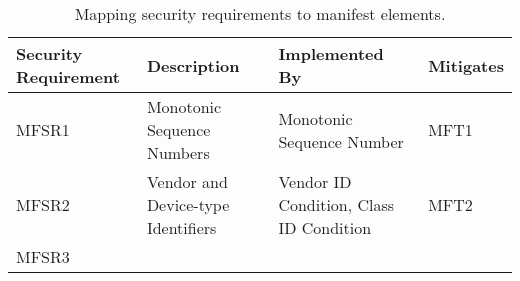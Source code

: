 \documentclass[0-thesis.tex]{subfiles}
\begin{document}
\begin{longtable}[]{@{}llll@{}}
    \caption{Mapping security requirements to manifest elements.}
    \label{tab:requirements-to-elements}\\
    \toprule
    \begin{minipage}[b]{0.16\columnwidth}\raggedright\strut Security Requirement\strut
    \end{minipage} & \begin{minipage}[b]{0.29\columnwidth}\raggedright\strut
    Description\strut \end{minipage} &
    \begin{minipage}[b]{0.34\columnwidth}\raggedright\strut Implemented By\strut
    \end{minipage} & \begin{minipage}[b]{0.10\columnwidth}\raggedright\strut
    Mitigates\strut \end{minipage}\tabularnewline
    \midrule
    \endhead
    \begin{minipage}[t]{0.16\columnwidth}\raggedright\strut MFSR1\strut \end{minipage} &
    \begin{minipage}[t]{0.29\columnwidth}\raggedright\strut Monotonic Sequence
    Numbers\strut \end{minipage} & \begin{minipage}[t]{0.34\columnwidth}\raggedright\strut
    Monotonic Sequence Number\strut \end{minipage} &
    \begin{minipage}[t]{0.10\columnwidth}\raggedright\strut MFT1\strut
    \end{minipage}\tabularnewline
    \begin{minipage}[t]{0.16\columnwidth}\raggedright\strut MFSR2\strut \end{minipage} &
    \begin{minipage}[t]{0.29\columnwidth}\raggedright\strut Vendor and Device-type
    Identifiers\strut \end{minipage} &
    \begin{minipage}[t]{0.34\columnwidth}\raggedright\strut Vendor ID Condition, Class ID
    Condition\strut \end{minipage} &
    \begin{minipage}[t]{0.10\columnwidth}\raggedright\strut MFT2\strut
    \end{minipage}\tabularnewline
    \begin{minipage}[t]{0.16\columnwidth}\raggedright\strut MFSR3\strut \end{minipage} &

\end{longtable}
\end{document}
